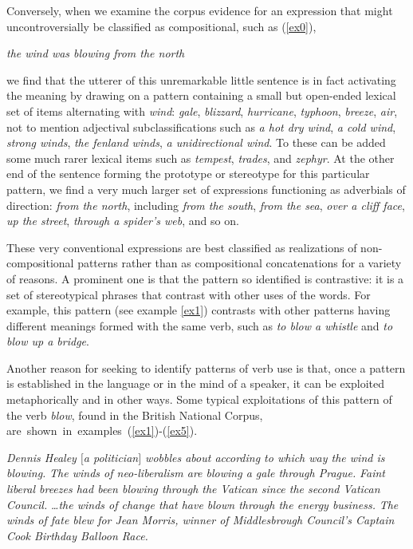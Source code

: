 \documentclass[output=paper]{langsci/langscibook}
\begin{document}
Conversely, when we examine the corpus evidence for an expression that
might uncontroversially be classified as compositional, such as (\ref{ex0}), 


\ea
\label{ex0}
\textit{the wind was blowing from the north}
\z



\noindent we find that the utterer of this unremarkable little sentence is in fact
activating the meaning by drawing on a pattern containing a small but
open-ended lexical set of items alternating with \textit{wind}: \textit{gale},
\textit{blizzard}, \textit{hurricane}, \textit{typhoon}, \textit{breeze}, \textit{air}, not to mention adjectival
subclassifications such as \textit{a hot dry wind}, \textit{a cold wind}, \textit{strong winds},
\textit{the fenland winds}, \textit{a unidirectional wind}. To these can be added some
much rarer lexical items such as \textit{tempest}, \textit{trades}, and \textit{zephyr}. At the
other end of the sentence forming the prototype or stereotype for this
particular pattern, we find a very much larger set of expressions
functioning as adverbials of direction: \textit{from the north}, including
\textit{from the south}, \textit{from the sea}, \textit{over a cliff face}, \textit{up the street}, \textit{through
a spider’s web}, and so on. 



These very conventional expressions are best classified as realizations
of non-compositional patterns  rather than as compositional
concatenations for a variety of reasons. A prominent one is that the
pattern so identified is contrastive: it is a set of stereotypical
phrases that contrast with other uses of the words. For example, this
pattern (see example \ref{ex1}) contrasts with other patterns having different
meanings formed with the same verb, such as \textit{to blow a whistle} and \textit{to
blow up a bridge}. 



Another reason for seeking to identify patterns of verb use is that,
once a pattern is established in the language or in the mind of a
speaker, it can be exploited metaphorically and in other ways. Some
typical exploitations of this pattern of the verb \textit{blow}, found in the
British National Corpus, \mbox{are shown in examples (\ref{ex1})-(\ref{ex5})}.



\ea
\label{ex1}
 \textit{Dennis Healey $[$a politician$]$ wobbles about according to which way
the wind is blowing.} 
\ex \label{ex2}
\textit{The winds of neo-liberalism are blowing a gale through Prague.}
\ex \label{ex3} 
\textit{Faint liberal breezes had been blowing through the Vatican since the
  second Vatican Council.}
\ex \label{ex4}  
\textit{\ldots the winds of change that have blown through the energy business.}
\ex \label{ex5} 
\textit{The winds of fate blew for Jean Morris, winner of Middlesbrough
Council's Captain Cook Birthday Balloon Race.}
\z
\end{document}
